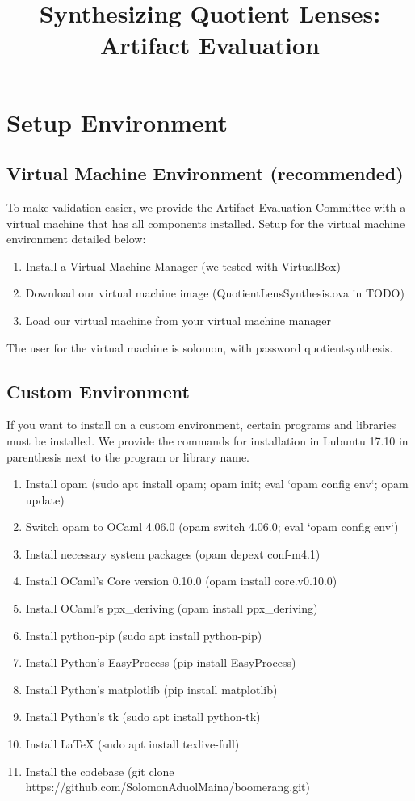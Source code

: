\documentclass[acmsmall,review,anonymous]{acmart}
\begin{document}
\title{Synthesizing Quotient Lenses: Artifact Evaluation}
\maketitle

\section{Setup Environment}
\subsection{Virtual Machine Environment (recommended)}
To make validation easier, we provide the Artifact Evaluation Committee with a
virtual machine that has all components installed.  Setup for the virtual
machine environment detailed below:
\begin{enumerate}
\item Install a Virtual Machine Manager (we tested with VirtualBox)
\item Download our virtual machine image (QuotientLensSynthesis.ova in TODO)
\item Load our virtual machine from your virtual machine manager
\end{enumerate}

The user for the virtual machine is solomon, with password quotientsynthesis.

\subsection{Custom Environment}
If you want to install on a custom environment, certain programs and libraries
must be installed.  We provide the commands for installation in Lubuntu 17.10
in parenthesis next to the program or library name.

\begin{enumerate}
\item Install opam (sudo apt install opam; opam init; eval `opam config env`;
  opam update)
\item Switch opam to OCaml 4.06.0 (opam switch 4.06.0; eval `opam config env`)
\item Install necessary system packages (opam depext conf-m4.1)
\item Install OCaml's Core version 0.10.0 (opam install core.v0.10.0)
\item Install OCaml's ppx\_deriving (opam install ppx\_deriving)
  
\item Install python-pip (sudo apt install python-pip)
\item Install Python's EasyProcess (pip install EasyProcess)
\item Install Python's matplotlib (pip install matplotlib)
\item Install Python's tk (sudo apt install python-tk)
\item Install \LaTeX \; (sudo apt install texlive-full)

\item Install the codebase (git clone
https://github.com/SolomonAduolMaina/boomerang.git)
 
\end{enumerate}
\end{document}
